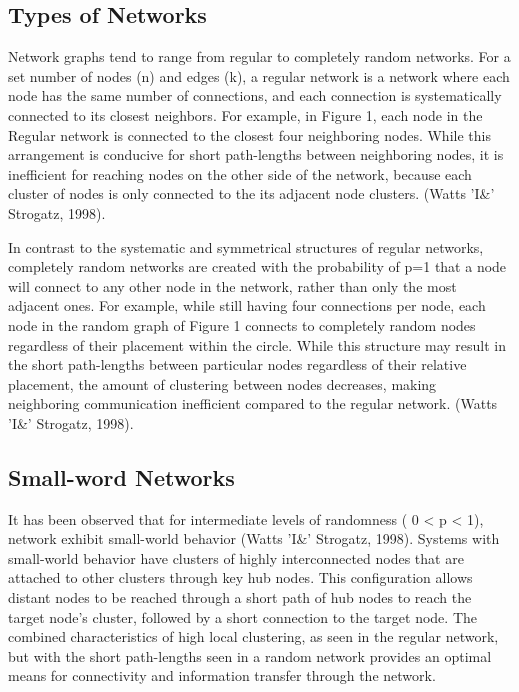 \documentclass[11pt,letterpaper,doublespacing,titlepage]{article}
\begin{document}
\subsection{Types of Networks}
\par
Network graphs tend to range from regular to completely random networks. For a set number of nodes (n) and edges (k), a regular network is a network where each node has the same number of connections, and each connection is systematically connected to its closest neighbors. For example, in Figure 1, each node in the Regular network is connected to the closest four neighboring nodes. While this arrangement is conducive for short path-lengths between neighboring nodes, it is inefficient for reaching nodes on the other side of the network, because each cluster of nodes is only connected to the its adjacent node clusters. (Watts 'I\&' Strogatz, 1998).
\par
In contrast to the systematic and symmetrical structures of regular networks, completely random networks are created with the probability of p=1 that a node will connect to any other node in the network, rather than only the most adjacent ones. For example, while still having four connections per node, each node in the random graph of Figure 1 connects to completely random nodes regardless of their placement within the circle. While this structure may result in the short path-lengths between particular nodes regardless of their relative placement, the amount of clustering between nodes decreases, making neighboring communication inefficient compared to the regular network.  (Watts 'I\&' Strogatz, 1998).
\subsection{Small-word Networks}
\par
It has been observed that for intermediate levels of randomness ( 0 < p < 1),  network exhibit small-world behavior (Watts 'I\&' Strogatz, 1998). Systems with small-world behavior have clusters of highly interconnected nodes that are attached to other clusters through key hub nodes. This configuration allows distant nodes to be reached through a short path of hub nodes to reach the target node’s cluster, followed by a short connection to the target node. The combined characteristics of  high local clustering, as seen in the regular network, but with the short path-lengths seen in a random network provides an optimal means for connectivity and information transfer through the network. 
\end{document}

